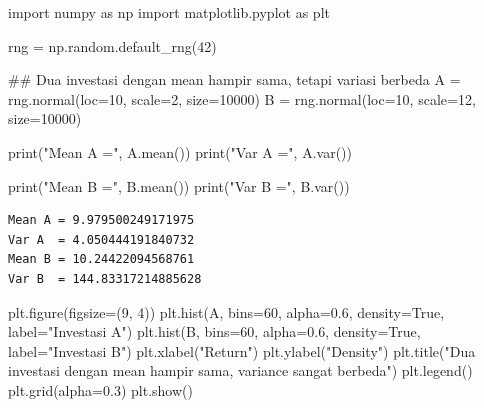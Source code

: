 \documentclass[
  letterpaper,
  DIV=11,
  numbers=noendperiod]{scrreprt}
\newenvironment{Shaded}{\begin{snugshade}}{\end{snugshade}}
\newcommand{\BuiltInTok}[1]{\textcolor[rgb]{0.00,0.23,0.31}{#1}}
\newcommand{\CommentTok}[1]{\textcolor[rgb]{0.37,0.37,0.37}{#1}}
\newcommand{\DecValTok}[1]{\textcolor[rgb]{0.68,0.00,0.00}{#1}}
\newcommand{\FloatTok}[1]{\textcolor[rgb]{0.68,0.00,0.00}{#1}}
\newcommand{\ImportTok}[1]{\textcolor[rgb]{0.00,0.46,0.62}{#1}}
\newcommand{\NormalTok}[1]{\textcolor[rgb]{0.00,0.23,0.31}{#1}}
\newcommand{\OperatorTok}[1]{\textcolor[rgb]{0.37,0.37,0.37}{#1}}
\newcommand{\StringTok}[1]{\textcolor[rgb]{0.13,0.47,0.30}{#1}}
\newcommand{\VariableTok}[1]{\textcolor[rgb]{0.07,0.07,0.07}{#1}}
\begin{document}
\begin{Shaded}
\begin{Highlighting}[]
\ImportTok{import}\NormalTok{ numpy }\ImportTok{as}\NormalTok{ np}
\ImportTok{import}\NormalTok{ matplotlib.pyplot }\ImportTok{as}\NormalTok{ plt}

\NormalTok{rng }\OperatorTok{=}\NormalTok{ np.random.default\_rng(}\DecValTok{42}\NormalTok{)}

\CommentTok{\#\# Dua investasi dengan mean hampir sama, tetapi variasi berbeda}
\NormalTok{A }\OperatorTok{=}\NormalTok{ rng.normal(loc}\OperatorTok{=}\DecValTok{10}\NormalTok{, scale}\OperatorTok{=}\DecValTok{2}\NormalTok{, size}\OperatorTok{=}\DecValTok{10000}\NormalTok{)}
\NormalTok{B }\OperatorTok{=}\NormalTok{ rng.normal(loc}\OperatorTok{=}\DecValTok{10}\NormalTok{, scale}\OperatorTok{=}\DecValTok{12}\NormalTok{, size}\OperatorTok{=}\DecValTok{10000}\NormalTok{)}

\BuiltInTok{print}\NormalTok{(}\StringTok{"Mean A ="}\NormalTok{, A.mean())}
\BuiltInTok{print}\NormalTok{(}\StringTok{"Var A  ="}\NormalTok{, A.var())}

\BuiltInTok{print}\NormalTok{(}\StringTok{"Mean B ="}\NormalTok{, B.mean())}
\BuiltInTok{print}\NormalTok{(}\StringTok{"Var B  ="}\NormalTok{, B.var())}
\end{Highlighting}
\end{Shaded}

\begin{verbatim}
Mean A = 9.979500249171975
Var A  = 4.050444191840732
Mean B = 10.24422094568761
Var B  = 144.83317214885628
\end{verbatim}

\begin{Shaded}
\begin{Highlighting}[]
\NormalTok{plt.figure(figsize}\OperatorTok{=}\NormalTok{(}\DecValTok{9}\NormalTok{, }\DecValTok{4}\NormalTok{))}
\NormalTok{plt.hist(A, bins}\OperatorTok{=}\DecValTok{60}\NormalTok{, alpha}\OperatorTok{=}\FloatTok{0.6}\NormalTok{, density}\OperatorTok{=}\VariableTok{True}\NormalTok{, label}\OperatorTok{=}\StringTok{"Investasi A"}\NormalTok{)}
\NormalTok{plt.hist(B, bins}\OperatorTok{=}\DecValTok{60}\NormalTok{, alpha}\OperatorTok{=}\FloatTok{0.6}\NormalTok{, density}\OperatorTok{=}\VariableTok{True}\NormalTok{, label}\OperatorTok{=}\StringTok{"Investasi B"}\NormalTok{)}
\NormalTok{plt.xlabel(}\StringTok{"Return"}\NormalTok{)}
\NormalTok{plt.ylabel(}\StringTok{"Density"}\NormalTok{)}
\NormalTok{plt.title(}\StringTok{"Dua investasi dengan mean hampir sama, variance sangat berbeda"}\NormalTok{)}
\NormalTok{plt.legend()}
\NormalTok{plt.grid(alpha}\OperatorTok{=}\FloatTok{0.3}\NormalTok{)}
\NormalTok{plt.show()}
\end{Highlighting}
\end{Shaded}
\end{document}
